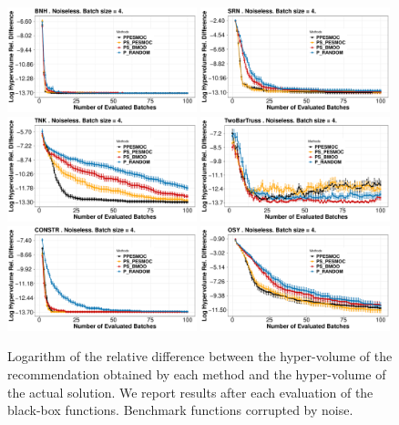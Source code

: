 \begin{figure}[ht]
\begin{center}
\includegraphics[width=0.49\textwidth]{Figures/ppesmoc/BNH.pdf}
\includegraphics[width=0.49\textwidth]{Figures/ppesmoc/SRN.pdf} \\
\includegraphics[width=0.49\textwidth]{Figures/ppesmoc/TNK.pdf}
\includegraphics[width=0.49\textwidth]{Figures/ppesmoc/TBT.pdf} \\
\includegraphics[width=0.49\textwidth]{Figures/ppesmoc/CONSTR.pdf}
\includegraphics[width=0.49\textwidth]{Figures/ppesmoc/OSY.pdf} \\
\caption{Logarithm of the relative difference between the hyper-volume of the recommendation obtained by each method and the hyper-volume of the actual solution. We report results after each evaluation of the black-box functions. Benchmark functions corrupted by noise.}
\label{fig:bench}
\end{center}
\end{figure}


